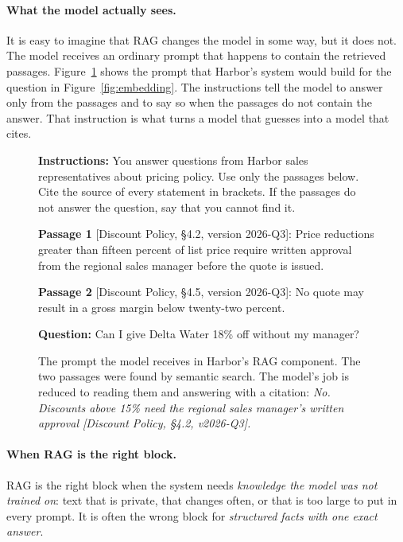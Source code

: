 \paragraph{What the model actually sees.} It is easy to imagine that RAG changes the model in some way, but it does not. The model receives an ordinary prompt that happens to contain the retrieved passages. Figure~\ref{fig:rag-prompt} shows the prompt that Harbor's system would build for the question in Figure~\ref{fig:embedding}. The instructions tell the model to answer only from the passages and to say so when the passages do not contain the answer. That instruction is what turns a model that guesses into a model that cites.

\begin{figure}[htbp]
\centering
\begin{tcolorbox}[colback=white, colframe=black!50, boxrule=0.5pt, arc=1pt, width=0.92\textwidth, fontupper=\ttfamily\footnotesize, left=6pt, right=6pt]
\textbf{Instructions:} You answer questions from Harbor sales representatives about pricing policy. Use only the passages below. Cite the source of every statement in brackets. If the passages do not answer the question, say that you cannot find it.\par\medskip
\textbf{Passage 1} [Discount Policy, \S4.2, version 2026-Q3]: Price reductions greater than fifteen percent of list price require written approval from the regional sales manager before the quote is issued.\par\smallskip
\textbf{Passage 2} [Discount Policy, \S4.5, version 2026-Q3]: No quote may result in a gross margin below twenty-two percent.\par\medskip
\textbf{Question:} Can I give Delta Water 18\% off without my manager?
\end{tcolorbox}
\caption{The prompt the model receives in Harbor's RAG component. The two passages were found by semantic search. The model's job is reduced to reading them and answering with a citation: \emph{No. Discounts above 15\% need the regional sales manager's written approval [Discount Policy, \S4.2, v2026-Q3].}}
\label{fig:rag-prompt}
\end{figure}

\paragraph{When RAG is the right block.} RAG is the right block when the system needs \emph{knowledge the model was not trained on}: text that is private, that changes often, or that is too large to put in every prompt. It is often the wrong block for \emph{structured facts with one exact answer}.

